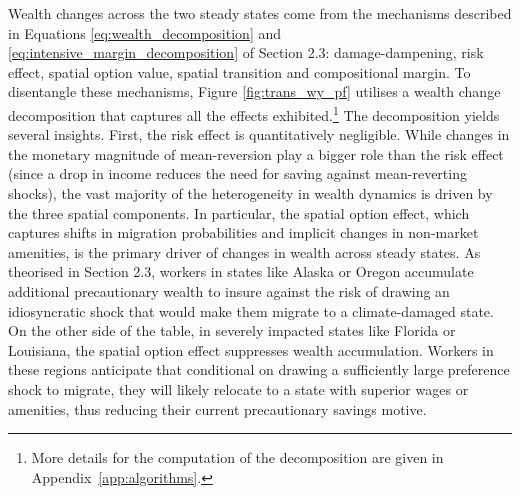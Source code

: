 \documentclass[12pt, a4paper]{article}
\begin{document}
Wealth changes across the two steady states come from the mechanisms described in Equations \ref{eq:wealth_decomposition} and \ref{eq:intensive_margin_decomposition} of Section 2.3: damage-dampening, risk effect, spatial option value, spatial transition and compositional margin.
To disentangle these mechanisms, Figure \ref{fig:trans_wy_pf} utilises a wealth change decomposition that captures all the effects exhibited.\footnote{More details for the computation of the decomposition are given in Appendix~\ref{app:algorithms}.} The decomposition yields several insights. First, the risk effect is quantitatively negligible. While changes in the monetary magnitude of mean-reversion play a bigger role than the risk effect (since a drop in income reduces the need for saving against mean-reverting shocks), the vast majority of the heterogeneity in wealth dynamics is driven by the three spatial components. In particular, the spatial option effect, which captures shifts in migration probabilities and implicit changes in non-market amenities, is the primary driver of changes in wealth across steady states. As theorised in Section 2.3, workers in states like Alaska or Oregon accumulate additional precautionary wealth to insure against the risk of drawing an idiosyncratic shock that would make them migrate to a climate-damaged state. On the other side of the table, in severely impacted states like Florida or Louisiana, the spatial option effect suppresses wealth accumulation. Workers in these regions anticipate that conditional on drawing a sufficiently large preference shock to migrate, they will likely relocate to a state with superior wages or amenities, thus reducing their current precautionary savings motive.
\end{document}

